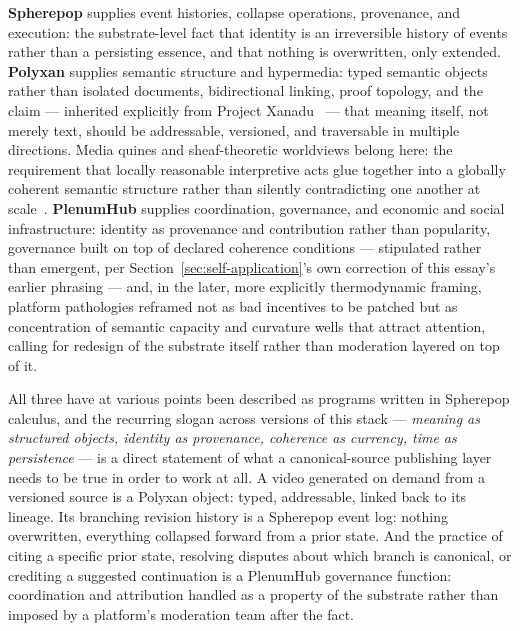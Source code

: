 \documentclass[11pt]{article}
\theoremstyle{definition}
\begin{document}
\textbf{Spherepop} supplies event histories, collapse operations, provenance, and execution: the substrate-level fact that identity is an irreversible history of events rather than a persisting essence, and that nothing is overwritten, only extended. \textbf{Polyxan} supplies semantic structure and hypermedia: typed semantic objects rather than isolated documents, bidirectional linking, proof topology, and the claim --- inherited explicitly from Project Xanadu~\cite{nelson1999} --- that meaning itself, not merely text, should be addressable, versioned, and traversable in multiple directions. Media quines and sheaf-theoretic worldviews belong here: the requirement that locally reasonable interpretive acts glue together into a globally coherent semantic structure rather than silently contradicting one another at scale~\cite{maclane1992}. \textbf{PlenumHub} supplies coordination, governance, and economic and social infrastructure: identity as provenance and contribution rather than popularity, governance built on top of declared coherence conditions --- stipulated rather than emergent, per Section~\ref{sec:self-application}'s own correction of this essay's earlier phrasing --- and, in the later, more explicitly thermodynamic framing, platform pathologies reframed not as bad incentives to be patched but as concentration of semantic capacity and curvature wells that attract attention, calling for redesign of the substrate itself rather than moderation layered on top of it.

All three have at various points been described as programs written in Spherepop calculus, and the recurring slogan across versions of this stack --- \emph{meaning as structured objects, identity as provenance, coherence as currency, time as persistence} --- is a direct statement of what a canonical-source publishing layer needs to be true in order to work at all. A video generated on demand from a versioned source is a Polyxan object: typed, addressable, linked back to its lineage. Its branching revision history is a Spherepop event log: nothing overwritten, everything collapsed forward from a prior state. And the practice of citing a specific prior state, resolving disputes about which branch is canonical, or crediting a suggested continuation is a PlenumHub governance function: coordination and attribution handled as a property of the substrate rather than imposed by a platform's moderation team after the fact.
\end{document}

